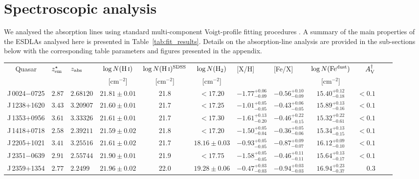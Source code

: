 \documentclass[fleqn,usenatbib,useAMS]{mnras}
\newcommand{\HI}{H\,{\sc i}}
\begin{document}
\section{Spectroscopic analysis}\label{sec:spectroscopic_analysis}

We analysed the absorption lines using standard multi-component Voigt-profile fitting procedures \citep[for the details see][]{Balashev2019}. A summary of the main properties of the ESDLAs analysed here is presented in Table~\ref{tab:fit_results}.  Details on the absorption-line analysis are provided in the sub-sections below with the corresponding table parameters and figures presented in the appendix. 

\renewcommand\arraystretch{1.2}
\begin{table*}
\centering
\caption{Main derived properties of the ESDLAs.}
\label{tab:fit_results}
\begin{tabular}{cllcccllcrcc}
\hline %
Quasar & $z_{\rm em}^{\star}$&$z_{\rm abs}$  & $\log N(\text{\HI})$& $\log N(\text{\HI})^{\rm SDSS}$  & $\log N(\rm H_2)$ & [X/H] & [Fe/X] & $\log N(\rm Fe^{dust})$&$A_{\rm V}^\dagger$ \\ 
& & & [cm$^{-2}$]& [cm$^{-2}$]& [cm$^{-2}$]& & & [cm$^{-2}$]& \\
\hline
J\,0024$-$0725  &$2.87$& $2.68120$ & $21.81\pm0.01$ & 21.8&$<17.20$ & $-1.77^{+0.06}_{-0.09}$ &  $-0.56^{+0.10}_{-0.09}$ &$15.40^{+0.12}_{-0.18}$& $<0.1$   \\
J\,1238$+$1620  &$3.43$&$3.20907$ &  $21.60\pm0.01$ & 21.7&$<17.25$ & $-1.01^{+0.05}_{-0.05}$ & $-0.43^{+0.06}_{-0.05}$&$15.89^{+0.13}_{-0.16}$& $<0.1$   \\
J\,1353$+$0956 &$3.61$&$3.33326$ & $21.61\pm0.01$ & 21.7&$<17.30$ & $-1.61^{+0.13}_{-0.20}$ &  $-0.46^{+0.22}_{-0.15}$ &$15.32^{+0.22}_{-0.61}$& $<0.1$ \\
J\,1418$+$0718 &$2.58$&$2.39211$ & $21.59\pm0.02$ & 21.8&$<17.20$ & $-1.50^{+0.05}_{-0.04}$ & $-0.36^{+0.05}_{-0.06}$ &$15.34^{+0.13}_{-0.15}$& $<0.1$   \\
J\,2205$+$1021 &$3.41$&$3.25516$ & $21.61\pm0.02$ & 21.7&$18.16\pm0.03$  & $-0.93^{+0.05}_{-0.05}$ & $-0.87^{+0.09}_{-0.07}$ &$16.12^{+0.09}_{-0.10}$& $<0.1$   \\
J\,2351$-$0639&$2.91$&$2.55744$& $21.90\pm0.01$ & 21.9&$<17.75$ & $-1.58^{+0.05}_{-0.05}$ & $-0.46^{+0.11}_{-0.11}$ & $15.64^{+0.13}_{-0.17}$&$<0.1$  \\
J\,2359$+$1354&$2.77$&$2.2499$ & $21.96\pm0.02$ & 22.0&$19.28\pm0.06$ & $-0.47^{+0.03}_{-0.03}$ & $-0.94^{+0.03}_{-0.03}$ &$16.94^{+0.23}_{-0.37}$& $0.3$   \\

\end{tabular}
\end{table*}
\end{document}

